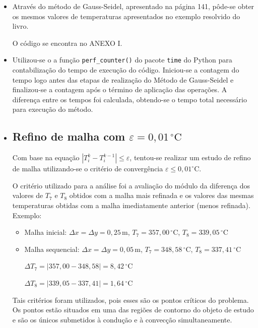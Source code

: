 \begin{itemize}
    \item[1) a)]Através do método de Gauss-Seidel, apresentado na página 141, pôde-se obter os mesmos valores de temperaturas apresentados no exemplo resolvido do livro.
    
    O código se encontra no ANEXO I.

    \item[b)]Utilizou-se o a função \texttt{perf\_counter()} do pacote \texttt{time} do Python para contabilização do tempo de execução do código. Iniciou-se a contagem do tempo logo antes das etapas de realização do Método de Gauss-Seidel e finalizou-se a contagem após o término de aplicação das operações. A diferença entre os tempos foi calculada, obtendo-se o tempo total necessário para execução do método.
    
    \item[c)]\subsection*{Refino de malha com $\varepsilon = 0,01\,^\circ\mathrm{C}$}
    Com base na equação $|T_{i}^{k} - T_{i}^{k-1}| \le \varepsilon$, tentou-se realizar um estudo de refino de malha utilizando-se o critério de convergência $\varepsilon \le 0,01^\circ\mathrm{C}$.

    O critério utilizado para a análise foi a avaliação do módulo da diferença dos valores de $T_7$ e $T_8$ obtidos com a malha mais refinada e os valores das mesmas temperaturas obtidas com a malha imediatamente anterior (menos refinada).
    \clearpage
        \small
        Exemplo:
        \begin{itemize}
            \item[-]Malha inicial: $\Delta x = \Delta y = 0,25\,\mathrm{m}$, $T_7 = 357,00\,^\circ\mathrm{C}$, $T_8 = 339,05\,^\circ\mathrm{C}$
            \item[-]Malha sequencial: $\Delta x = \Delta y = 0,05\,\mathrm{m}$, $T_7 = 348,58\,^\circ\mathrm{C}$, $T_8 = 337,41\,^\circ\mathrm{C}$
            
            \vspace{0.2cm}
            
            $\Delta T_7 = |357,00 - 348,58| = 8,42\,\mathrm{^\circ\mathrm{C}}$ 

            $\Delta T_8 = |339,05 - 337,41| = 1,64\,\mathrm{^\circ\mathrm{C}}$        
        \end{itemize}
    Tais critérios foram utilizados, pois esses são os pontos críticos do problema. Os pontos estão situados em uma das regiões de contorno do objeto de estudo e são os únicos submetidos à condução e à convecção simultaneamente.


\end{itemize}
